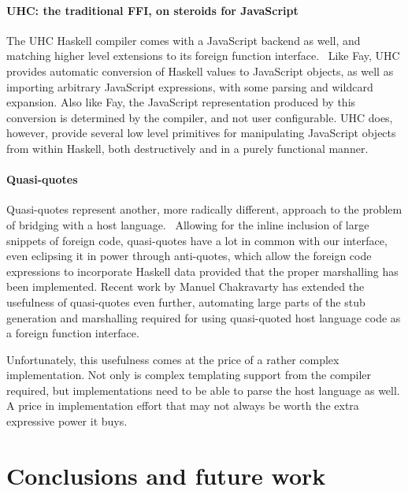 \documentclass{sigplanconf}
\begin{document}
\paragraph{UHC: the traditional FFI, on steroids for JavaScript}
The UHC Haskell compiler comes with a JavaScript backend as well, and matching
higher level extensions to its foreign function interface.\ \cite{uhc}
Like Fay, UHC provides automatic conversion of Haskell values to JavaScript
objects, as well as importing arbitrary JavaScript expressions, with some
parsing and wildcard expansion.
Also like Fay, the JavaScript representation produced by this
conversion is determined by the compiler, and not user configurable.
UHC does, however, provide several low level primitives for manipulating
JavaScript objects from within Haskell, both destructively and in a purely
functional manner.

\paragraph{Quasi-quotes}
Quasi-quotes represent another, more radically different, approach to the
problem of bridging with a host language.\ \cite{quasiquotes}
Allowing for the inline inclusion of large snippets of foreign code,
quasi-quotes have a lot in common with our interface, even eclipsing it in
power through anti-quotes, which allow the foreign code expressions to
incorporate Haskell data provided that the proper marshalling has been
implemented. Recent work by Manuel Chakravarty has extended the usefulness of
quasi-quotes even further, automating large parts of the stub generation
and marshalling required for using quasi-quoted host language code as a
foreign function interface.\ \cite{language-c-inline}

Unfortunately, this usefulness comes at the price of a rather complex
implementation. Not only is complex templating support from the compiler
required, but implementations need to be able to parse the host language as
well. A price in implementation effort that may not always be worth the extra
expressive power it buys.

\section{Conclusions and future work}
\label{sec:conclusion}
\end{document}
